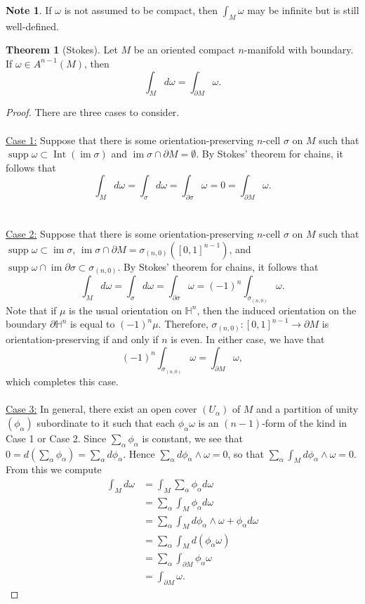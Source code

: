\documentclass[10pt,letterpaper,cm]{nupset}
\theoremstyle{definition}
\newtheorem{note}[definition]{Note}
\theoremstyle{theorem}
\newtheorem{theorem}[definition]{Theorem}
\theoremstyle{remark}
\renewcommand{\H}{\mathbb H}
\newcommand{\1}{\mathbf{1}}
\newcommand{\0}{\vec 0}
\DeclareMathOperator{\im}{im}
\DeclareMathOperator{\Int}{Int}
\DeclareMathOperator{\supp}{supp}
\begin{document}
\begin{note}
If $\omega$ is not assumed to be compact, then $\int_M \omega$ may be infinite but is still well-defined.
\end{note}

\begin{theorem}[Stokes]
Let $M$ be an oriented compact $n$-manifold with boundary. If $\omega \in A^{n-1}(M)$, then $$ \int_M d\omega = \int_{\partial{M}} \omega  .$$
\end{theorem}
\begin{proof} There are three cases to consider.
\\ \\
\underline{Case 1:} Suppose that there is some orientation-preserving $n$-cell $\sigma$ on $M$ such that $\supp \omega \subset \Int(\im \sigma)$ and $\im \sigma \cap \partial{M} =\emptyset$. By Stokes' theorem for chains, it follows that $$\int_M d\omega  = \int_{\sigma} d\omega = \int_{\partial{\sigma}} \omega = 0 = \int_{\partial{M}} \omega    .$$
\\ \\
\underline{Case 2:} Suppose that there is some orientation-preserving $n$-cell $\sigma$ on $M$ such that $\supp \omega \subset  \im \sigma$, $\im \sigma \cap \partial{M} =\sigma_{(n,0)}([0,1]^{n-1})$, and $\supp \omega \cap \im \partial{\sigma} \subset \sigma_{(n,0)}$. By Stokes' theorem for chains, it follows that $$\int_M d\omega  = \int_{\sigma} d\omega = \int_{\partial{\sigma}} \omega = (-1)^n \int_{\sigma_{(n,0)}} \omega .$$ Note that if $\mu$ is the usual orientation on $\H^n$, then the induced orientation on the boundary $\partial{\H^n}$ is equal to $(-1)^n \mu$. Therefore, $\sigma_{(n,0)} : [0,1]^{n-1}\to \partial{M}$ is orientation-preserving  if and only if $n$ is even. In either case, we have that $$(-1)^n \int_{\sigma_{(n,0)}} \omega = \int_{\partial{M}} \omega  ,$$ which completes this case.
\\ \\
\underline{Case 3:} In general, there exist an open cover $(U_{\alpha})$ of $M$ and a partition of unity $(\phi_{\alpha})$ subordinate to it such that each $\phi_{\alpha}\omega$ is an $(n-1)$-form of the kind in Case 1 or Case 2. Since $\sum_{\alpha} \phi_{\alpha}$ is constant, we see that $0 = d\left(\sum_{\alpha} \phi_{\alpha} \right) = \sum_{\alpha} d \phi_{\alpha}$. Hence $ \sum_{\alpha} d \phi_{\alpha} \wedge \omega =0$, so that $\sum_{\alpha} \int_M d\phi_{\alpha} \wedge \omega =0$. From this we compute
\begin{align*}
 \int_M d\omega & = \int_M \sum_{\alpha} \phi_{\alpha} d\omega 
 \\ & = \sum_{\alpha}\int_M \phi_{\alpha} d\omega
\\ & =  \sum_{\alpha}\int_M d\phi_{\alpha} \wedge \omega + \phi_{\alpha} d\omega 
\\ & =  \sum_{\alpha}\int_M d(\phi_{\alpha} \omega)
\\ & = \sum_{\alpha} \int_{\partial{M}} \phi_{\alpha} \omega 
\\ & =  \int_{\partial{M}} \omega .
\end{align*}
\end{proof}
\end{document}
